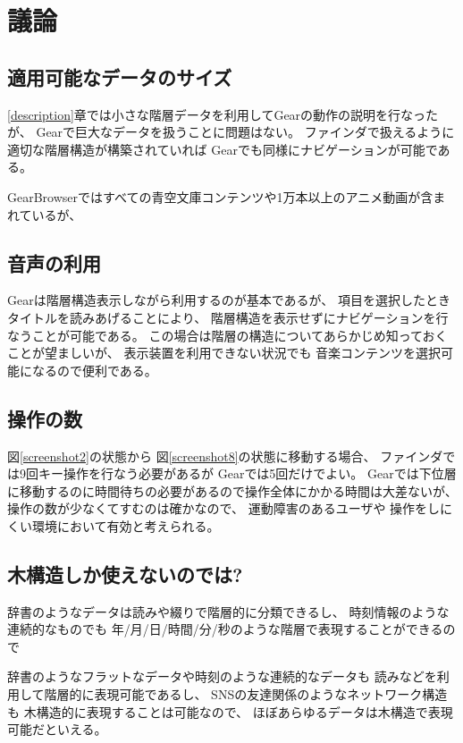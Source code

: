\documentclass[twoside]{wiss}
\def\GEAR{\textsf{Gear}}
\def\GB{\textsf{GearBrowser}}
\begin{document}
\section{議論}

\subsection*{適用可能なデータのサイズ}

\ref{description}章では小さな階層データを利用して{\GEAR}の動作の説明を行なったが、
{\GEAR}で巨大なデータを扱うことに問題はない。
ファインダで扱えるように適切な階層構造が構築されていれば
{\GEAR}でも同様にナビゲーションが可能である。

{\GB}ではすべての青空文庫コンテンツや1万本以上のアニメ動画が含まれているが、

\subsection*{音声の利用}

{\GEAR}は階層構造表示しながら利用するのが基本であるが、
項目を選択したときタイトルを読みあげることにより、
階層構造を表示せずにナビゲーションを行なうことが可能である。
この場合は階層の構造についてあらかじめ知っておくことが望ましいが、
表示装置を利用できない状況でも
音楽コンテンツを選択可能になるので便利である。

\subsection*{操作の数}

図\ref{screenshot2}の状態から
図\ref{screenshot8}の状態に移動する場合、
ファインダでは9回キー操作を行なう必要があるが
{\GEAR}では5回だけでよい。
{\GEAR}では下位層に移動するのに時間待ちの必要があるので操作全体にかかる時間は大差ないが、
操作の数が少なくてすむのは確かなので、
運動障害のあるユーザや
操作をしにくい環境において有効と考えられる。

\subsection*{木構造しか使えないのでは?}

辞書のようなデータは読みや綴りで階層的に分類できるし、
時刻情報のような連続的なものでも
年/月/日/時間/分/秒のような階層で表現することができるので

辞書のようなフラットなデータや時刻のような連続的なデータも
読みなどを利用して階層的に表現可能であるし、
SNSの友達関係のようなネットワーク構造も
木構造的に表現することは可能なので、
ほぼあらゆるデータは木構造で表現可能だといえる。
\end{document}
